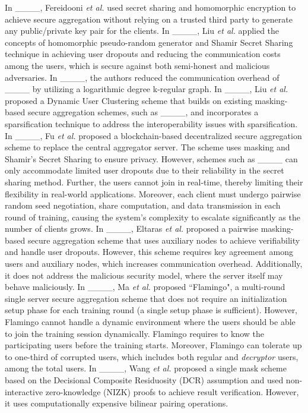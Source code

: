 In ____, Fereidooni \emph{et al.} used secret sharing and homomorphic encryption to achieve secure aggregation without relying on a trusted third party to generate any public/private key pair for the clients. In ____, Liu \emph{et al.} applied the concepts of homomorphic pseudo-random generator and Shamir Secret Sharing technique in achieving user dropouts and reducing the communication costs among the users, which is secure against both semi-honest and malicious adversaries. In ____, the authors reduced the communication overhead of ____ by utilizing a logarithmic degree k-regular graph. In ____, Liu \emph{et al.} proposed a Dynamic User Clustering scheme that builds on existing masking-based secure aggregation schemes, such as ____, and incorporates a sparsification technique to address the interoperability issues with sparsification. In ____, Fu \emph{et al.} proposed a blockchain-based decentralized secure aggregation scheme to replace the central aggregator server. The scheme uses masking and Shamir's Secret Sharing to ensure privacy. However, schemes such as ____ can only accommodate limited user dropouts due to their reliability in the secret sharing method. Further, the users cannot join in real-time, thereby limiting their flexibility in real-world applications. 
Moreover, each client must undergo pairwise random seed negotiation, share computation, and data transmission in each round of training, causing the system's complexity to escalate significantly as the number of clients grows. In ____, Eltaras \emph{et al.} proposed a pairwise masking-based secure aggregation scheme that uses auxiliary nodes to achieve verifiability and handle user dropouts. However, this scheme requires key agreement among users and auxiliary nodes, which increases communication overhead. Additionally, it does not address the malicious security model, where the server itself may behave maliciously. 
In ____, Ma \emph{et al.} proposed ``Flamingo", a multi-round single server secure aggregation scheme that does not require an initialization setup phase for each training round (a single setup phase is sufficient). 
However, Flamingo cannot handle a dynamic environment where the users should be able to join the training session dynamically. Flamingo requires to know the participating users before the training starts. Moreover, Flamingo can tolerate up to one-third of corrupted users, which includes both regular and \emph{decryptor} users, among the total users. In ____, Wang \emph{et al.} proposed a single mask scheme based on the Decisional Composite Residuosity (DCR) assumption and used non-interactive zero-knowledge (NIZK) proofs to achieve result verification. However, it uses computationally expensive bilinear pairing operations. 
